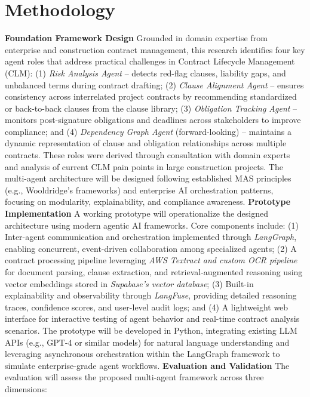 
\section{Methodology}\label{section:methodology}


\textbf{Foundation Framework Design}  
Grounded in domain expertise from enterprise and construction contract management, this research identifies four key agent roles that address practical challenges in Contract Lifecycle Management (CLM):  
(1) \textit{Risk Analysis Agent} – detects red-flag clauses, liability gaps, and unbalanced terms during contract drafting;  
(2) \textit{Clause Alignment Agent} – ensures consistency across interrelated project contracts by recommending standardized or back-to-back clauses from the clause library;  
(3) \textit{Obligation Tracking Agent} – monitors post-signature obligations and deadlines across stakeholders to improve compliance; and  
(4) \textit{Dependency Graph Agent} (forward-looking) – maintains a dynamic representation of clause and obligation relationships across multiple contracts.  
These roles were derived through consultation with domain experts and analysis of current CLM pain points in large construction projects.  
The multi-agent architecture will be designed following established MAS principles (e.g., Wooldridge's frameworks) and enterprise AI orchestration patterns, focusing on modularity, explainability, and compliance awareness.
\newline
\break
\textbf{Prototype Implementation}  
A working prototype will operationalize the designed architecture using modern agentic AI frameworks. Core components include:  
(1) Inter-agent communication and orchestration implemented through \textit{LangGraph}, enabling concurrent, event-driven collaboration among specialized agents;  
(2) A contract processing pipeline leveraging \textit{AWS Textract and custom OCR pipeline} for document parsing, clause extraction, and retrieval-augmented reasoning using vector embeddings stored in \textit{Supabase's vector database};  
(3) Built-in explainability and observability through \textit{LangFuse}, providing detailed reasoning traces, confidence scores, and user-level audit logs; and  
(4) A lightweight web interface for interactive testing of agent behavior and real-time contract analysis scenarios.  
The prototype will be developed in Python, integrating existing LLM APIs (e.g., GPT-4 or similar models) for natural language understanding and leveraging asynchronous orchestration within the LangGraph framework to simulate enterprise-grade agent workflows.
\newline
\break
\textbf{Evaluation and Validation}
The evaluation will assess the proposed multi-agent framework across three dimensions:


